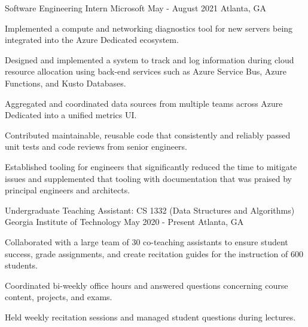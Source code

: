 

\begin{cventries}

\cventry
{Software Engineering Intern}
{Microsoft}
{May - August 2021}
{Atlanta, GA}
{
\begin{cvitems}
    \item Implemented a compute and networking diagnostics tool for
    new servers being integrated into the Azure Dedicated ecosystem.
    \item Designed and implemented a system to track and log information during cloud resource allocation
    using back-end services such as Azure Service Bus, Azure Functions, and Kusto Databases.
    \item Aggregated and coordinated data sources from multiple teams across Azure Dedicated
    into a unified metrics UI.
    \item Contributed maintainable, reusable code that consistently and reliably passed unit tests and code reviews from senior engineers.
    \item Established tooling for engineers that significantly reduced the time to mitigate issues
    and supplemented that tooling with documentation that was praised by principal engineers and architects.
\end{cvitems}
}

\cventry
{Undergraduate Teaching Assistant: CS 1332 (Data Structures and Algorithms)} %
{Georgia Institute of Technology} %
{May 2020 - Present} %
{Atlanta, GA} %
{ %
\begin{cvitems}
    \item Collaborated with a large team of 30 co-teaching assistants
    to ensure student success, grade assignments, and create recitation guides
    for the instruction of 600 students.
    \item Coordinated bi-weekly office hours and answered
    questions concerning course content, projects, and exams.
    \item Held weekly recitation sessions and managed student questions during lectures.
\end{cvitems}
}



\end{cventries}
